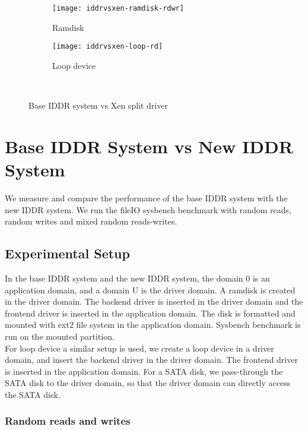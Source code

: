 \begin{figure}[!ht]
  \begin{subfigure}[b]{0.2\textwidth}
  \texttt{[image: iddrvsxen-ramdisk-rdwr]}
  \caption{Ramdisk}
  \label{fig:iddrvsxen-ramdisk-rdwr}
  \end{subfigure}
  \hspace{50mm}
  \begin{subfigure}[b]{0.2\textwidth}
  \texttt{[image: iddrvsxen-loop-rd]}
  \caption{Loop device}
  \label{fig:iddrvsxen-loop-rd}
  \end{subfigure}\\
\caption{Base IDDR system vs Xen split driver}\label{fig:seqloopdisk}
\end{figure}


\section{Base IDDR System vs New IDDR System}
We measure and compare the performance of the base IDDR system with the new IDDR system. We run the fileIO sysbench benchmark with random reads, random writes and mixed random reads-writes. 
\subsection*{Experimental Setup}
In the base IDDR system and the new IDDR system, the domain 0 is an application domain, and a domain U is the driver domain. A ramdisk is created in the driver domain. The backend driver is inserted in the driver domain and the frontend driver is inserted in the application domain. The disk is formatted and mounted with ext2 file system in the application domain. Sysbench benchmark is run on the mounted partition. 
\\[3mm]
For loop device a similar setup is used, we create a loop device in a driver domain, and insert the backend driver in the driver domain. The frontend driver is inserted in the application domain. For a SATA disk, we pass-through the SATA disk to the driver domain, so that the driver domain can directly access the SATA disk. 

\subsubsection*{Random reads and writes}
